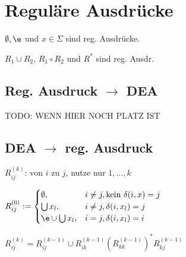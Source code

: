 \section*{Reguläre Ausdrücke}
$\emptyset, \e$ und $x \in \Sigma$ sind reg. Ausdrücke.

$R_1 \cup R_2$, $R_1 \circ R_2$ und $R^*$ sind reg. Ausdr.

\subsection*{Reg. Ausdruck $\longrightarrow$ DEA}
TODO: WENN HIER NOCH PLATZ IST

\subsection*{DEA $\longrightarrow$ reg. Ausdruck}
$R_{ij}^{(k)}$: von $i$ zu $j$, nutze nur $1,\ldots,k$

$\displaystyle
	R_{ij}^{(0)} := \begin{cases}
		\emptyset, & i \neq j, \text{kein $\delta(i,x)=j$} \\
		\bigcup x_l, & i \neq j, \delta(i,x_l)=j \\
		\e \cup \bigcup x_l, & i = j, \delta(i, x_l) = i  \\
	\end{cases}
$

$\displaystyle
R_{ij}^{(k)} = R_{ij}^{(k-1)} \cup R_{ik}^{(k-1)} \left( R_{kk}^{(k-1)} \right)^* R_{kj}^{(k-1)}
$
